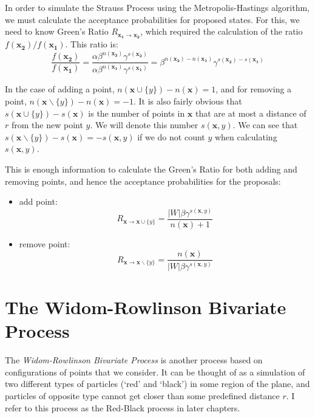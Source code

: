 In order to simulate the Strauss Process using the Metropolis-Hastings
algorithm, we must calculate the acceptance probabilities for proposed
states.  For this, we need to know Green's Ratio $R_{\mathbf{x_1} \to
\mathbf{x_2}}$, which required the calculation of the ratio
$f(\mathbf{x_2})/f(\mathbf{x_1})$.  This ratio is:
\begin{equation}
\frac{f(\mathbf{x_2})}{f(\mathbf{x_1})} =
  \frac{\alpha \beta^{n(\mathbf{x_2})} \gamma^{s(\mathbf{x_2})}}
       {\alpha \beta^{n(\mathbf{x_1})} \gamma^{s(\mathbf{x_1})}} =
  \beta^{n(\mathbf{x_2}) - n(\mathbf{x_1})}
  \gamma^{s(\mathbf{x_2}) - s(\mathbf{x_1})}
\end{equation}


In the case of adding a point, $n(\mathbf{x} \cup \{y\}) -
n(\mathbf{x}) = 1$, and for removing a point, $n(\mathbf{x} \backslash
\{y\}) - n(\mathbf{x}) = -1$.  It is also fairly obvious that
$s(\mathbf{x} \cup \{y\}) - s(\mathbf{x})$ is the number of
points in $\mathbf{x}$ that are at most a distance of $r$ from the new
point $y$.  We will denote this number $s(\mathbf{x}, y)$.  We can see
that $s(\mathbf{x} \backslash \{y\}) - s(\mathbf{x}) = -s(\mathbf{x},
y)$ if we do not count $y$ when calculating $s(\mathbf{x}, y)$.

This is enough information to calculate the Green's Ratio for both
adding and removing points, and hence the acceptance probabilities for
the proposals:

\begin{itemize}
\item add point:
\begin{equation}
  R_{\mathbf{x} \to \mathbf{x} \cup \{y\}} =
   \frac{|W| \beta \gamma^{s(\mathbf{x}, y)}}{n(\mathbf{x}) + 1}
\end{equation}

\item remove point:
\begin{equation}
  R_{\mathbf{x} \to \mathbf{x} \backslash \{y\}} =
    \frac{n(\mathbf{x})}{|W| \beta \gamma^{s(\mathbf{x}, y)}}
\end{equation}

\end{itemize}

\section{The Widom-Rowlinson Bivariate Process}\label{sect:widom-rowlinson}

The \emph{Widom-Rowlinson Bivariate Process} \cite{widom-rowlinson} is
another process based on configurations of points that we consider.
It can be thought of as a simulation of two different types of
particles (`red' and `black') in some region of the plane, and
particles of opposite type cannot get closer than some predefined
distance $r$.  I refer to this process as the Red-Black process in
later chapters.

